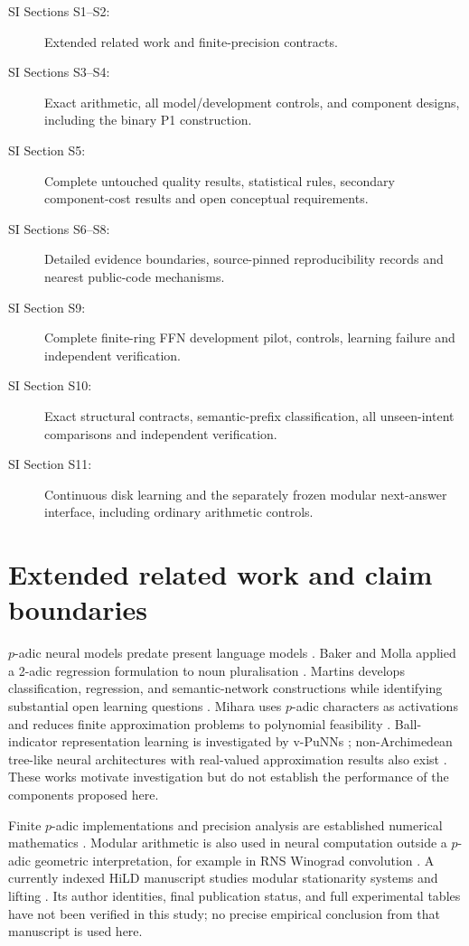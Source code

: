 \documentclass[11pt]{article}
\begin{document}
\begin{description}
\item[SI Sections S1--S2:] Extended related work and finite-precision contracts.
\item[SI Sections S3--S4:] Exact arithmetic, all model/development controls,
and component designs, including the binary P1 construction.
\item[SI Section S5:] Complete untouched quality results, statistical rules,
secondary component-cost results and open conceptual requirements.
\item[SI Sections S6--S8:] Detailed evidence boundaries, source-pinned
reproducibility records and nearest public-code mechanisms.
\item[SI Section S9:] Complete finite-ring FFN development pilot, controls,
learning failure and independent verification.
\item[SI Section S10:] Exact structural contracts, semantic-prefix classification,
all unseen-intent comparisons and independent verification.
\item[SI Section S11:] Continuous disk learning and the separately frozen
modular next-answer interface, including ordinary arithmetic controls.
\end{description}

\sloppy
\section{Extended related work and claim boundaries}
\label{si:related}

\(p\)-adic neural models predate present language models
\citep{albeverio1999networks}. Baker and Molla applied a 2-adic regression
formulation to noun pluralisation \citep{baker2022pluralisation}. Martins
develops classification, regression, and semantic-network constructions while
identifying substantial open learning questions \citep{martins2025learning}.
Mihara uses \(p\)-adic characters as activations and reduces finite approximation
problems to polynomial feasibility \citep{mihara2026character}.
Ball-indicator representation learning is investigated by v-PuNNs
\citep{nguessan2025vpunn}; non-Archimedean tree-like neural architectures with
real-valued approximation results also exist \citep{zuniga2026deep}.
These works motivate investigation but do not establish the performance of the
components proposed here.

Finite \(p\)-adic implementations and precision analysis are established
numerical mathematics \citep{caruso2017computations}. Modular arithmetic is also
used in neural computation outside a \(p\)-adic geometric interpretation, for
example in RNS Winograd convolution \citep{liu2020rns}. A currently indexed HiLD
manuscript studies modular stationarity systems and lifting
\citep{padiclowbit2026}. Its author identities, final publication status, and
full experimental tables have not been verified in this study; no precise
empirical conclusion from that manuscript is used here.
\end{document}
